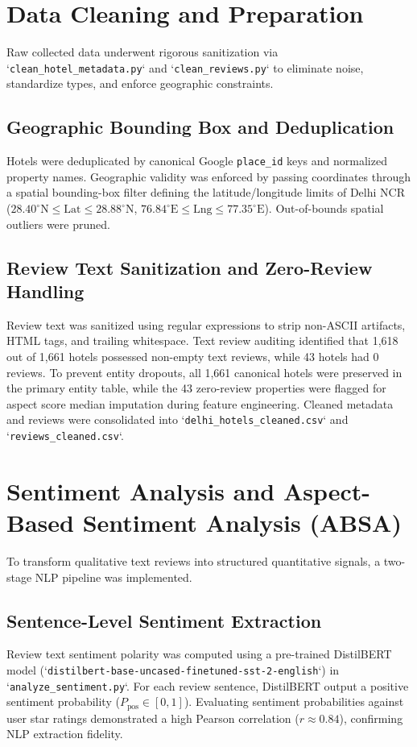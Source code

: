 \section{Data Cleaning and Preparation}
Raw collected data underwent rigorous sanitization via `\texttt{clean\_hotel\_metadata.py}` and `\texttt{clean\_reviews.py}` to eliminate noise, standardize types, and enforce geographic constraints.

\subsection{Geographic Bounding Box and Deduplication}
Hotels were deduplicated by canonical Google \texttt{place\_id} keys and normalized property names. Geographic validity was enforced by passing coordinates through a spatial bounding-box filter defining the latitude/longitude limits of Delhi NCR ($28.40^\circ\text{N} \le \text{Lat} \le 28.88^\circ\text{N}$, $76.84^\circ\text{E} \le \text{Lng} \le 77.35^\circ\text{E}$). Out-of-bounds spatial outliers were pruned.

\subsection{Review Text Sanitization and Zero-Review Handling}
Review text was sanitized using regular expressions to strip non-ASCII artifacts, HTML tags, and trailing whitespace. Text review auditing identified that 1,618 out of 1,661 hotels possessed non-empty text reviews, while 43 hotels had 0 reviews. To prevent entity dropouts, all 1,661 canonical hotels were preserved in the primary entity table, while the 43 zero-review properties were flagged for aspect score median imputation during feature engineering. Cleaned metadata and reviews were consolidated into `\texttt{delhi\_hotels\_cleaned.csv}` and `\texttt{reviews\_cleaned.csv}`.

\section{Sentiment Analysis and Aspect-Based Sentiment Analysis (ABSA)}
To transform qualitative text reviews into structured quantitative signals, a two-stage NLP pipeline was implemented.

\subsection{Sentence-Level Sentiment Extraction}
Review text sentiment polarity was computed using a pre-trained DistilBERT model (`\texttt{distilbert-base-uncased-finetuned-sst-2-english}`) in `\texttt{analyze\_sentiment.py}`. For each review sentence, DistilBERT output a positive sentiment probability ($P_{\text{pos}} \in [0, 1]$). Evaluating sentiment probabilities against user star ratings demonstrated a high Pearson correlation ($r \approx 0.84$), confirming NLP extraction fidelity.

